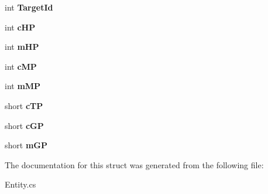 \begin{DoxyCompactItemize}
\item 
\hypertarget{structffxivlib_1_1_entity_1_1_e_n_t_i_t_y_i_n_f_o_a5037220e6d432e2fb27d089a0e33336d}{int {\bfseries Target\-Id}}\label{structffxivlib_1_1_entity_1_1_e_n_t_i_t_y_i_n_f_o_a5037220e6d432e2fb27d089a0e33336d}

\item 
\hypertarget{structffxivlib_1_1_entity_1_1_e_n_t_i_t_y_i_n_f_o_a4eb1c6c096373de42566abdbf6bc5921}{int {\bfseries c\-H\-P}}\label{structffxivlib_1_1_entity_1_1_e_n_t_i_t_y_i_n_f_o_a4eb1c6c096373de42566abdbf6bc5921}

\item 
\hypertarget{structffxivlib_1_1_entity_1_1_e_n_t_i_t_y_i_n_f_o_af2cbe0f7b155434b9995482b59a45992}{int {\bfseries m\-H\-P}}\label{structffxivlib_1_1_entity_1_1_e_n_t_i_t_y_i_n_f_o_af2cbe0f7b155434b9995482b59a45992}

\item 
\hypertarget{structffxivlib_1_1_entity_1_1_e_n_t_i_t_y_i_n_f_o_a81af69b94f15abeba9263682bd805ab5}{int {\bfseries c\-M\-P}}\label{structffxivlib_1_1_entity_1_1_e_n_t_i_t_y_i_n_f_o_a81af69b94f15abeba9263682bd805ab5}

\item 
\hypertarget{structffxivlib_1_1_entity_1_1_e_n_t_i_t_y_i_n_f_o_a3aad5eb2ed4ecff5e902cd054daf2d9b}{int {\bfseries m\-M\-P}}\label{structffxivlib_1_1_entity_1_1_e_n_t_i_t_y_i_n_f_o_a3aad5eb2ed4ecff5e902cd054daf2d9b}

\item 
\hypertarget{structffxivlib_1_1_entity_1_1_e_n_t_i_t_y_i_n_f_o_a680dced63aeb961d2d7ff24372f0b3df}{short {\bfseries c\-T\-P}}\label{structffxivlib_1_1_entity_1_1_e_n_t_i_t_y_i_n_f_o_a680dced63aeb961d2d7ff24372f0b3df}

\item 
\hypertarget{structffxivlib_1_1_entity_1_1_e_n_t_i_t_y_i_n_f_o_a905fc67478130ba6433fe2b9b4d0ddec}{short {\bfseries c\-G\-P}}\label{structffxivlib_1_1_entity_1_1_e_n_t_i_t_y_i_n_f_o_a905fc67478130ba6433fe2b9b4d0ddec}

\item 
\hypertarget{structffxivlib_1_1_entity_1_1_e_n_t_i_t_y_i_n_f_o_a27e352e8bc836e304bf2e894bb5e8763}{short {\bfseries m\-G\-P}}\label{structffxivlib_1_1_entity_1_1_e_n_t_i_t_y_i_n_f_o_a27e352e8bc836e304bf2e894bb5e8763}

\end{DoxyCompactItemize}


The documentation for this struct was generated from the following file\-:\begin{DoxyCompactItemize}
\item 
Entity.\-cs\end{DoxyCompactItemize}

